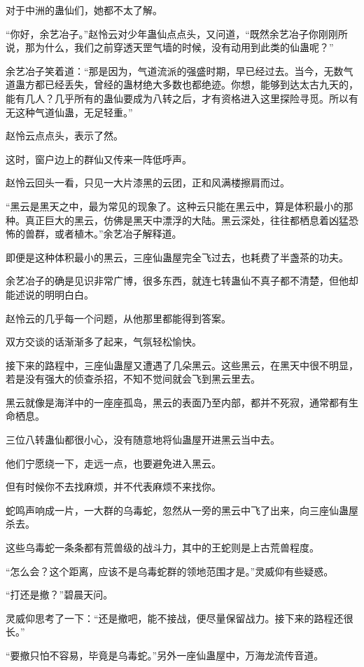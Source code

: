 \begin{this_body}
对于中洲的蛊仙们，她都不太了解。

“你好，余艺冶子。”赵怜云对少年蛊仙点点头，又问道，“既然余艺冶子你刚刚所说，那为什么，我们之前穿透天罡气墙的时候，没有动用到此类的仙蛊呢？”

余艺冶子笑着道：“那是因为，气道流派的强盛时期，早已经过去。当今，无数气道蛊方都已经丢失，曾经的蛊材绝大多数也都绝迹。你想，能够到达太古九天的，能有几人？几乎所有的蛊仙要成为八转之后，才有资格进入这里探险寻觅。所以有无这种气道仙蛊，无足轻重。”

赵怜云点点头，表示了然。

这时，窗户边上的群仙又传来一阵低呼声。

赵怜云回头一看，只见一大片漆黑的云团，正和风满楼擦肩而过。

“黑云是黑天之中，最为常见的现象了。这种云只能在黑云中，算是体积最小的那种。真正巨大的黑云，仿佛是黑天中漂浮的大陆。黑云深处，往往都栖息着凶猛恐怖的兽群，或者植木。”余艺冶子解释道。

即便是这种体积最小的黑云，三座仙蛊屋完全飞过去，也耗费了半盏茶的功夫。

余艺冶子的确是见识非常广博，很多东西，就连七转蛊仙不真子都不清楚，但他却能述说的明明白白。

赵怜云的几乎每一个问题，从他那里都能得到答案。

双方交谈的话渐渐多了起来，气氛轻松愉快。

接下来的路程中，三座仙蛊屋又遭遇了几朵黑云。这些黑云，在黑天中很不明显，若是没有强大的侦查杀招，不知不觉间就会飞到黑云里去。

黑云就像是海洋中的一座座孤岛，黑云的表面乃至内部，都并不死寂，通常都有生命栖息。

三位八转蛊仙都很小心，没有随意地将仙蛊屋开进黑云当中去。

他们宁愿绕一下，走远一点，也要避免进入黑云。

但有时候你不去找麻烦，并不代表麻烦不来找你。

蛇鸣声响成一片，一大群的乌毒蛇，忽然从一旁的黑云中飞了出来，向三座仙蛊屋杀去。

这些乌毒蛇一条条都有荒兽级的战斗力，其中的王蛇则是上古荒兽程度。

“怎么会？这个距离，应该不是乌毒蛇群的领地范围才是。”灵威仰有些疑惑。

“打还是撤？”碧晨天问。

灵威仰思考了一下：“还是撤吧，能不接战，便尽量保留战力。接下来的路程还很长。”

“要撤只怕不容易，毕竟是乌毒蛇。”另外一座仙蛊屋中，万海龙流传音道。


\end{this_body}
